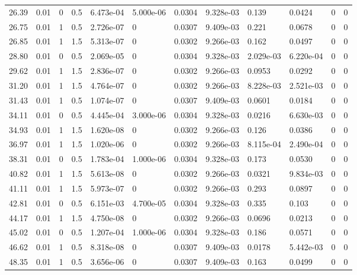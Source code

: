 \documentclass[preview]{standalone}
\begin{document}
{{\begin{tabular}{L{1.2cm}C{1.2cm} C{0.3cm}C{0.5cm} C{1.4cm}C{1.4cm} C{1.4cm}C{1.4cm} C{1.6cm}C{1.6cm} C{1.6cm}C{1.6cm}}
  26.39  &  0.01  & 0     & 0.5 &  6.473e-04  & 5.000e-06  &  0.0304&   9.328e-03& 0.139 & 0.0424   &  0 & 0  \\ 
  26.75  &  0.01  & 1     & 0.5 &  2.726e-07  & 0  &  0.0307&   9.409e-03& 0.221 & 0.0678   &  0 & 0  \\ 
  26.85  &  0.01  & 1     & 1.5 &  5.313e-07  & 0  &  0.0302&   9.266e-03& 0.162 & 0.0497   &  0 & 0  \\ 
  28.80  &  0.01  & 0     & 0.5 &  2.069e-05  & 0  &  0.0304&   9.328e-03& 2.029e-03 & 6.220e-04   &  0 & 0  \\ 
  29.62  &  0.01  & 1     & 1.5 &  2.836e-07  & 0  &  0.0302&   9.266e-03& 0.0953 & 0.0292   &  0 & 0  \\ 
  31.20  &  0.01  & 1     & 1.5 &  4.764e-07  & 0  &  0.0302&   9.266e-03& 8.228e-03 & 2.521e-03   &  0 & 0  \\ 
  31.43  &  0.01  & 1     & 0.5 &  1.074e-07  & 0  &  0.0307&   9.409e-03& 0.0601 & 0.0184   &  0 & 0  \\ 
  34.11  &  0.01  & 0     & 0.5 &  4.445e-04  & 3.000e-06  &  0.0304&   9.328e-03& 0.0216 & 6.630e-03   &  0 & 0  \\ 
  34.93  &  0.01  & 1     & 1.5 &  1.620e-08  & 0  &  0.0302&   9.266e-03& 0.126 & 0.0386   &  0 & 0  \\ 
  36.97  &  0.01  & 1     & 1.5 &  1.020e-06  & 0  &  0.0302&   9.266e-03& 8.115e-04 & 2.490e-04   &  0 & 0  \\ 
  38.31  &  0.01  & 0     & 0.5 &  1.783e-04  & 1.000e-06  &  0.0304&   9.328e-03& 0.173 & 0.0530   &  0 & 0  \\ 
  40.82  &  0.01  & 1     & 1.5 &  5.613e-08  & 0  &  0.0302&   9.266e-03& 0.0321 & 9.834e-03   &  0 & 0  \\ 
  41.11  &  0.01  & 1     & 1.5 &  5.973e-07  & 0  &  0.0302&   9.266e-03& 0.293 & 0.0897   &  0 & 0  \\ 
  42.81  &  0.01  & 0     & 0.5 &  6.151e-03  & 4.700e-05  &  0.0304&   9.328e-03& 0.335 & 0.103   &  0 & 0  \\ 
  44.17  &  0.01  & 1     & 1.5 &  4.750e-08  & 0  &  0.0302&   9.266e-03& 0.0696 & 0.0213   &  0 & 0  \\ 
  45.02  &  0.01  & 0     & 0.5 &  1.207e-04  & 1.000e-06  &  0.0304&   9.328e-03& 0.186 & 0.0571   &  0 & 0  \\ 
  46.62  &  0.01  & 1     & 0.5 &  8.318e-08  & 0  &  0.0307&   9.409e-03& 0.0178 & 5.442e-03   &  0 & 0  \\ 
  48.35  &  0.01  & 1     & 0.5 &  3.656e-06  & 0  &  0.0307&   9.409e-03& 0.163 & 0.0499   &  0 & 0  \\ 

\end{tabular}}}
\end{document}
